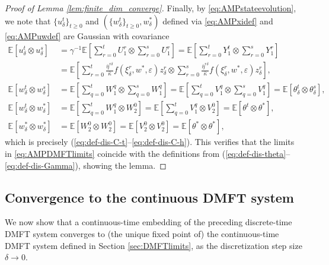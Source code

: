\documentclass[11pt,letterpaper,reqno]{amsart}
\theoremstyle{definition}
\def\eps{\varepsilon}
\def\E{\mathbb{E}}
\begin{document}
\begin{proof}[Proof of Lemma \ref{lem:finite_dim_converge}]
Finally, by \eqref{eq:AMPstateevolution},
we note that $\{u_\delta^t\}_{t \geq 0}$ and $(\{w_\delta^t\}_{t \geq 0},
w_\delta^*)$ defined via \eqref{eq:AMPxidef} and \eqref{eq:AMPuwdef} are
Gaussian with covariance
\begin{align*}
\E[u_\delta^t \otimes u_\delta^s]
&=\gamma^{-1}\E\left[\sum_{r=0}^t U_1^r \otimes \sum_{r=0}^s U_1^r\right]
=\E\left[\sum_{r=0}^t Y_1^t \otimes \sum_{r=0}^s Y_1^r\right]\\
&=\E\left[\sum_{r=0}^t \frac{\bar\eta^{r\delta}}{\bar\kappa}
f(\xi_\delta^r,w^*,\eps)z_\delta^r
\otimes \sum_{r=0}^s \frac{\bar\eta^{r\delta}}{\bar\kappa}
f(\xi_\delta^r,w^*,\eps)z_\delta^r\right],\\
\E[w_\delta^t \otimes w_\delta^s]
&=\E\left[\sum_{q=0}^t W_1^q \otimes \sum_{q=0}^s W_1^q\right]
=\E\left[\sum_{q=0}^t V_1^q \otimes \sum_{q=0}^s V_1^q\right]
=\E[\theta_\delta^t \otimes \theta_\delta^s],\\
\E[w_\delta^t \otimes w_\delta^*]
&=\E\left[\sum_{q=0}^t W_1^q \otimes W_2^0\right]
=\E\left[\sum_{q=0}^t V_1^q \otimes V_2^0\right]
=\E[\theta^t \otimes \theta^*],\\
\E[w_\delta^* \otimes w_\delta^*]
&=\E\left[W_2^0 \otimes W_2^0\right]
=\E\left[V_2^0 \otimes V_2^0\right]
=\E[\theta^* \otimes \theta^*],
\end{align*}
which is precisely (\ref{eq:def-dis-C-t}--\ref{eq:def-dis-C-h}). This verifies
that the limits in \eqref{eq:AMPDMFTlimits} coincide with the definitions from
(\ref{eq:def-dis-theta}--\ref{eq:def-dis-Gamma}), showing the lemma.
\end{proof}

\subsection{Convergence to the continuous DMFT system}\label{sec:deltaDMFTconvergence}

We now show that a continuous-time embedding of the preceding
discrete-time DMFT system converges to (the unique fixed
point of) the continuous-time DMFT system defined in Section
\ref{sec:DMFTlimits}, as the discretization step size $\delta \to 0$.
\end{document}
